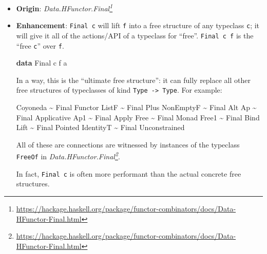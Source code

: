 \documentclass[]{article}
\newenvironment{Shaded}{}{}
\newcommand{\DataTypeTok}[1]{\textcolor[rgb]{0.56,0.13,0.00}{#1}}
\newcommand{\KeywordTok}[1]{\textcolor[rgb]{0.00,0.44,0.13}{\textbf{#1}}}
\newcommand{\NormalTok}[1]{#1}
\newcommand{\OperatorTok}[1]{\textcolor[rgb]{0.40,0.40,0.40}{#1}}
\renewcommand{\href}[2]{#2\footnote{\url{#1}}}
\begin{document}
\begin{itemize}
\item
  \textbf{Origin}:
  \emph{\href{https://hackage.haskell.org/package/functor-combinators/docs/Data-HFunctor-Final.html}{Data.HFunctor.Final}}
\item
  \textbf{Enhancement}: \texttt{Final\ c} will lift \texttt{f} into a free
  structure of any typeclass \texttt{c}; it will give it all of the actions/API
  of a typeclass for ``free''. \texttt{Final\ c\ f} is the ``free \texttt{c}''
  over \texttt{f}.

\begin{Shaded}
\begin{Highlighting}[]
\KeywordTok{data} \DataTypeTok{Final}\NormalTok{ c f a}
\end{Highlighting}
\end{Shaded}

  In a way, this is the ``ultimate free structure'': it can fully replace all
  other free structures of typeclasses of kind
  \texttt{Type\ -\textgreater{}\ Type}. For example:

\begin{Shaded}
\begin{Highlighting}[]
\DataTypeTok{Coyoneda}  \OperatorTok{\textasciitilde{}} \DataTypeTok{Final} \DataTypeTok{Functor}
\DataTypeTok{ListF}     \OperatorTok{\textasciitilde{}} \DataTypeTok{Final} \DataTypeTok{Plus}
\DataTypeTok{NonEmptyF} \OperatorTok{\textasciitilde{}} \DataTypeTok{Final} \DataTypeTok{Alt}
\DataTypeTok{Ap}        \OperatorTok{\textasciitilde{}} \DataTypeTok{Final} \DataTypeTok{Applicative}
\DataTypeTok{Ap1}       \OperatorTok{\textasciitilde{}} \DataTypeTok{Final} \DataTypeTok{Apply}
\DataTypeTok{Free}      \OperatorTok{\textasciitilde{}} \DataTypeTok{Final} \DataTypeTok{Monad}
\DataTypeTok{Free1}     \OperatorTok{\textasciitilde{}} \DataTypeTok{Final} \DataTypeTok{Bind}
\DataTypeTok{Lift}      \OperatorTok{\textasciitilde{}} \DataTypeTok{Final} \DataTypeTok{Pointed}
\DataTypeTok{IdentityT} \OperatorTok{\textasciitilde{}} \DataTypeTok{Final} \DataTypeTok{Unconstrained}
\end{Highlighting}
\end{Shaded}

  All of these are connections are witnessed by instances of the typeclass
  \texttt{FreeOf} in
  \emph{\href{https://hackage.haskell.org/package/functor-combinators/docs/Data-HFunctor-Final.html}{Data.HFunctor.Final}}.

  In fact, \texttt{Final\ c} is often more performant than the actual concrete
  free structures.


\end{itemize}
\end{document}
